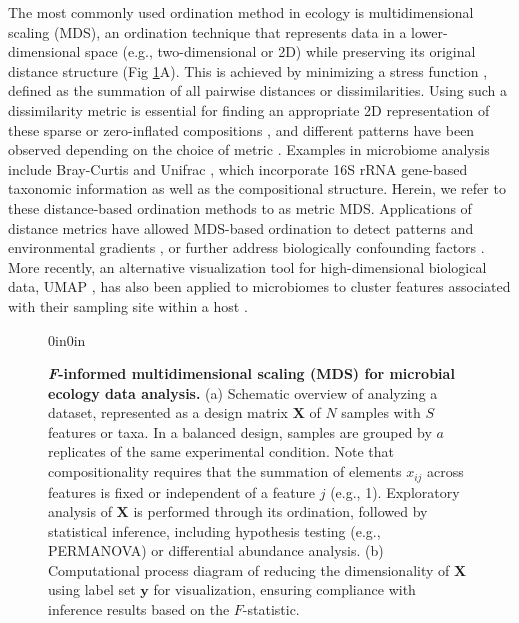 \documentclass[10pt,letterpaper]{article}
\newcommand{\1}{{\rm 1}\kern-0.24em{\rm I}}
\begin{document}
The most commonly used ordination method in ecology \cite{Jeganathan21} is multidimensional scaling (MDS), an ordination technique that represents data in a lower-dimensional space (e.g., two-dimensional or 2D) while preserving its original distance structure (Fig \ref{fig:intro}A).
This is achieved by minimizing a stress function \cite{borg97a}, defined as the summation of all pairwise distances or dissimilarities. 
Using such a dissimilarity metric is essential for finding an appropriate 2D representation of these sparse or zero-inflated compositions \cite{gijbels13}, and different patterns have been observed depending on the choice of metric \cite{Armstrong22, Shi22}. Examples in microbiome analysis include Bray-Curtis \cite{Bray57} and Unifrac \cite{lozupone05, lozupone07}, which incorporate 16S rRNA gene-based taxonomic information as well as the compositional structure. Herein, we refer to these distance-based ordination methods to as metric MDS.
Applications of distance metrics have allowed MDS-based ordination to detect patterns and environmental gradients \cite{Kuczynski10}, or further address biologically confounding factors \cite{Shi20, Wang22}.
More recently, an alternative visualization tool for high-dimensional biological data, UMAP \cite{McInnes18}, has also been applied to microbiomes to cluster features associated with their sampling site within a host \cite{Armstrong21}.


\begin{figure}[h!]
\begin{adjustwidth}{0in}{0in}
    \centering
    \caption{\textbf{\textit{F}-informed multidimensional scaling (MDS) for microbial ecology data analysis.} (a) Schematic overview of analyzing a dataset, represented as a design matrix $\mathbf{X}$ of $N$ samples with $S$ features or taxa. In a balanced design, samples are grouped by $a$ replicates of the same experimental condition. Note that compositionality requires that the summation of elements $x_{ij}$ across features is fixed or independent of a feature $j$ (e.g., 1). Exploratory analysis of $\mathbf{X}$ is performed through its ordination, followed by statistical inference, including hypothesis testing (e.g., PERMANOVA) or differential abundance analysis. (b) Computational process diagram of reducing the dimensionality of $\mathbf{X}$ using label set $\mathbf{y}$ for visualization, ensuring compliance with inference results based on the $F$-statistic.}
    \label{fig:intro}
\end{adjustwidth}
\end{figure}
\end{document}
